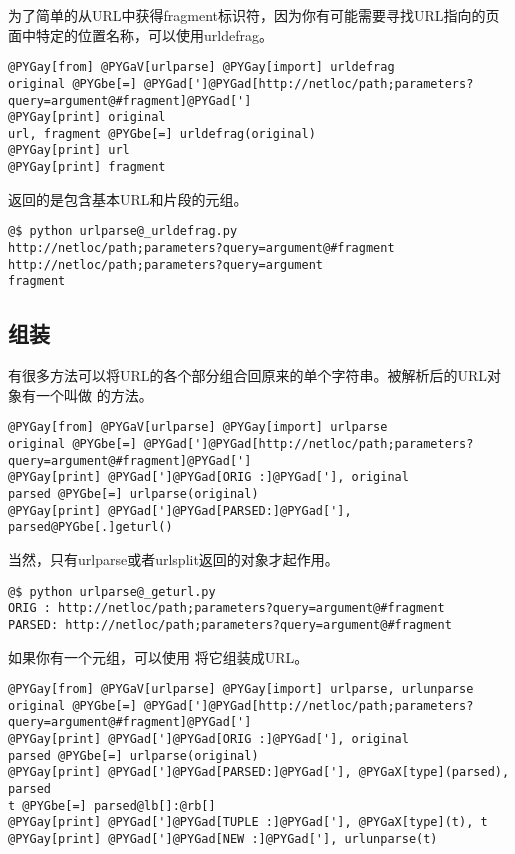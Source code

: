 \documentclass[a4paper,10pt,english]{manual}
\begin{document}
为了简单的从URL中获得fragment标识符，因为你有可能需要寻找URL指向的页面中特定的位置名称，可以使用urldefrag。

\begin{Verbatim}[commandchars=@\[\]]
@PYGay[from] @PYGaV[urlparse] @PYGay[import] urldefrag
original @PYGbe[=] @PYGad[']@PYGad[http://netloc/path;parameters?query=argument@#fragment]@PYGad[']
@PYGay[print] original
url, fragment @PYGbe[=] urldefrag(original)
@PYGay[print] url
@PYGay[print] fragment
\end{Verbatim}

返回的是包含基本URL和片段的元组。

\begin{Verbatim}[commandchars=@\[\]]
@$ python urlparse@_urldefrag.py
http://netloc/path;parameters?query=argument@#fragment
http://netloc/path;parameters?query=argument
fragment
\end{Verbatim}


\subsection{组装}

有很多方法可以将URL的各个部分组合回原来的单个字符串。被解析后的URL对象有一个叫做  的方法。

\begin{Verbatim}[commandchars=@\[\]]
@PYGay[from] @PYGaV[urlparse] @PYGay[import] urlparse
original @PYGbe[=] @PYGad[']@PYGad[http://netloc/path;parameters?query=argument@#fragment]@PYGad[']
@PYGay[print] @PYGad[']@PYGad[ORIG :]@PYGad['], original
parsed @PYGbe[=] urlparse(original)
@PYGay[print] @PYGad[']@PYGad[PARSED:]@PYGad['], parsed@PYGbe[.]geturl()
\end{Verbatim}

当然，只有urlparse或者urlsplit返回的对象才起作用。

\begin{Verbatim}[commandchars=@\[\]]
@$ python urlparse@_geturl.py
ORIG : http://netloc/path;parameters?query=argument@#fragment
PARSED: http://netloc/path;parameters?query=argument@#fragment
\end{Verbatim}

如果你有一个元组，可以使用  将它组装成URL。

\begin{Verbatim}[commandchars=@\[\]]
@PYGay[from] @PYGaV[urlparse] @PYGay[import] urlparse, urlunparse
original @PYGbe[=] @PYGad[']@PYGad[http://netloc/path;parameters?query=argument@#fragment]@PYGad[']
@PYGay[print] @PYGad[']@PYGad[ORIG :]@PYGad['], original
parsed @PYGbe[=] urlparse(original)
@PYGay[print] @PYGad[']@PYGad[PARSED:]@PYGad['], @PYGaX[type](parsed), parsed
t @PYGbe[=] parsed@lb[]:@rb[]
@PYGay[print] @PYGad[']@PYGad[TUPLE :]@PYGad['], @PYGaX[type](t), t
@PYGay[print] @PYGad[']@PYGad[NEW :]@PYGad['], urlunparse(t)
\end{Verbatim}
\end{document}
